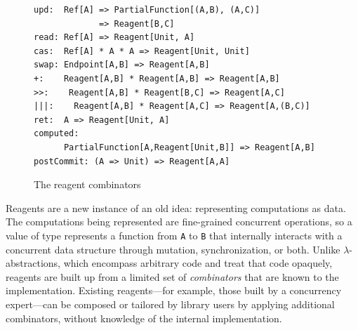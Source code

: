 \documentclass[preprint,nocopyrightspace]{sigplanconf}
\begin{document}
\begin{figure}
\begin{lstlisting}[mathescape=true,frame=single]
upd:  Ref[A] => PartialFunction[(A,B), (A,C)] 
             => Reagent[B,C]
read: Ref[A] => Reagent[Unit, A]
cas:  Ref[A] * A * A => Reagent[Unit, Unit]
swap: Endpoint[A,B] => Reagent[A,B]
+:    Reagent[A,B] * Reagent[A,B] => Reagent[A,B]
>>:    Reagent[A,B] * Reagent[B,C] => Reagent[A,C]
|||:    Reagent[A,B] * Reagent[A,C] => Reagent[A,(B,C)]  
ret:  A => Reagent[Unit, A]
computed: 
      PartialFunction[A,Reagent[Unit,B]] => Reagent[A,B]
postCommit: (A => Unit) => Reagent[A,A]
\end{lstlisting}
\nocaptionrule
\caption{The reagent combinators}
\label{fig:combinators}
\end{figure}


Reagents are a new instance of an old idea: representing computations as data.
The computations being represented are fine-grained concurrent operations, so
a value of type  represents a function from \lstinline{A} to
\lstinline{B} that internally interacts with a concurrent data structure
through mutation, synchronization, or both.
Unlike $\lambda$-abstractions, which encompass arbitrary code and treat that
code opaquely, reagents are built up from a limited set of \emph{combinators}
that are known to the implementation.  Existing reagents---for example, those
built by a concurrency expert---can be composed or tailored by library users
by applying additional combinators, without knowledge of the internal
implementation.  
\end{document}
